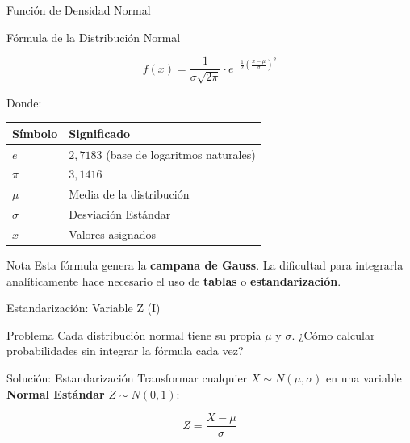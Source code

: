 \documentclass[10pt]{beamer}
\begin{document}
\begin{frame}{Función de Densidad Normal}
\begin{block}{Fórmula de la Distribución Normal}
\begin{center}
\Large
$$f(x) = \frac{1}{\sigma\sqrt{2\pi}} \cdot e^{-\frac{1}{2}\left(\frac{x-\mu}{\sigma}\right)^2}$$
\end{center}
\end{block}

\vspace{0.2cm}
\begin{exampleblock}{Donde:}
\begin{center}
\begin{tabular}{ll}
\toprule
\textbf{Símbolo} & \textbf{Significado} \\
\midrule
$e$ & $2{,}7183$ (base de logaritmos naturales) \\
$\pi$ & $3{,}1416$ \\
$\mu$ & Media de la distribución \\
$\sigma$ & Desviación Estándar \\
$x$ & Valores asignados \\
\bottomrule
\end{tabular}
\end{center}
\end{exampleblock}

\vspace{0.2cm}
\begin{alertblock}{Nota}
Esta fórmula genera la \textbf{campana de Gauss}. La dificultad para integrarla analíticamente hace necesario el uso de \textbf{tablas} o \textbf{estandarización}.
\end{alertblock}
\end{frame}

\begin{frame}{Estandarización: Variable Z (I)}
\begin{block}{Problema}
Cada distribución normal tiene su propia $\mu$ y $\sigma$. ¿Cómo calcular probabilidades sin integrar la fórmula cada vez?
\end{block}

\vspace{0.3cm}
\begin{exampleblock}{Solución: Estandarización}
Transformar cualquier $X \sim N(\mu, \sigma)$ en una variable \textbf{Normal Estándar} $Z \sim N(0, 1)$:
\begin{center}
\Huge
$$\boxed{Z = \frac{X - \mu}{\sigma}}$$
\end{center}
\end{exampleblock}
\end{frame}
\end{document}
